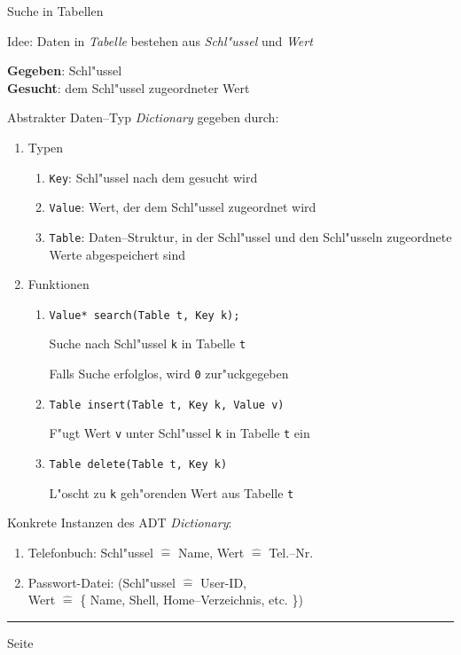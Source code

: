 \documentclass{slides}
\newcounter{mypage}
\begin{document}
\begin{center}
Suche in Tabellen
\end{center}

\footnotesize
Idee: Daten in \emph{Tabelle} bestehen aus \emph{Schl"ussel} und \emph{Wert}

\textbf{Gegeben}: \hspace*{0.3cm} Schl"ussel \\
\textbf{Gesucht}: \hspace*{0.5cm} dem Schl"ussel zugeordneter Wert

Abstrakter Daten--Typ \textsl{Dictionary} gegeben durch:
\begin{enumerate}
\item Typen
      \begin{enumerate}
      \item \texttt{Key}: Schl"ussel nach dem gesucht wird
      \item \texttt{Value}: Wert, der dem Schl"ussel zugeordnet wird
      \item \texttt{Table}: Daten--Struktur, in der Schl"ussel und den
            Schl"usseln zugeordnete Werte abgespeichert sind
      \end{enumerate}
\item Funktionen
      \begin{enumerate}
      \item \texttt{Value* search(Table t, Key k);}
        
            Suche nach Schl"ussel \texttt{k} in Tabelle \texttt{t}

            Falls Suche erfolglos, wird \texttt{0} zur"uckgegeben
      \item \texttt{Table insert(Table t, Key k, Value v)}

            F"ugt Wert \texttt{v} unter Schl"ussel \texttt{k} in Tabelle \texttt{t} ein
      \item \texttt{Table delete(Table t, Key k)}

            L"oscht zu \texttt{k} geh"orenden Wert aus Tabelle \texttt{t}
      \end{enumerate}
\end{enumerate}

Konkrete Instanzen des ADT \textsl{Dictionary}:
\begin{enumerate}
\item Telefonbuch: Schl"ussel $\widehat{=}$ Name,  Wert $\widehat{=}$ Tel.--Nr.
\item Passwort-Datei: (Schl"ussel $\widehat{=}$ User-ID, \\
      Wert $\widehat{=}$ \{ Name, Shell,  Home--Verzeichnis, etc. \})
\end{enumerate}


\vspace*{0.2cm}
\scriptsize

\vspace*{\fill}
\tiny \addtocounter{mypage}{1}
\rule{17cm}{1mm}
  \hspace*{\fill} Seite 



\end{document}
